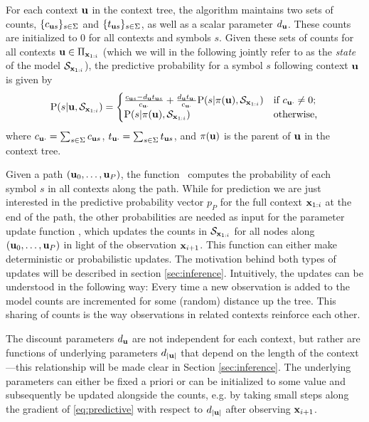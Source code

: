 For each context $\ubf$ in the context tree, the algorithm maintains two sets of counts, 
$\{c_{\ubf s}\}_{s \in \Sigma}$ and $\{t_{\ubf s}\}_{s \in \Sigma}$,
as well as a scalar parameter $d_{\ubf}$. These counts are initialized to
$0$ for all contexts and symbols $s$.
Given these sets of counts for all contexts $\ubf \in \Pi_{\xbf_{1:i}}$
(which we will in the following jointly refer to as the
\emph{state} of the model
$\statei$), the predictive probability for a symbol
$s$ following context $\ubf$ is given by
\begin{equation}
    \Prob(s|\ubf,\statei) = 
    \begin{cases}
    \frac{\cus - d_{\ubf} \tus}{\cu} + \frac{d_{\ubf}\tu
    }{\cu}\Prob(s|\parent(\ubf),\statei) & \text{if $\cu\neq 0$;} \\
    \Prob(s|\parent(\ubf),\statei) & \text{otherwise,}
    \end{cases}
    \label{eq:predictive}
\end{equation}
where $\cu = \sum_{s\in \Sigma} \cus$, $\tu =\sum_{s\in \Sigma} \tus$, and $\parent(\ubf)$ is the parent of $\ubf$ in the context tree.

Given a path $\Path$, the function 
\PathProbability\ computes the probability of each 
symbol $s$ in all contexts along the path. While for prediction we are just
interested in the predictive probability vector $p_P$ for the full context
$\xbf_{1:i}$ at the end of the path, the other probabilities are needed as input for the parameter update function \UpdatePath, which updates the counts in $\statei$ 
for all nodes along $\Path$ in light of the observation $\xbf_{i+1}$. 
This function can either make deterministic or probabilistic updates. The
motivation behind both types of updates will be described in section
\ref{sec:inference}. 
%
Intuitively, the updates can be understood in the following way: Every time a
new observation is added to the model counts are incremented for some (random)
distance up the tree.  This sharing of counts is the way observations in
related contexts reinforce each other.  

The discount parameters $d_{\ubf}$ are not independent for each context, but
rather are functions of underlying parameters $d_{|\ubf|}$ that depend on the
length of the context---this relationship will be made clear in Section
\ref{sec:inference}. The underlying parameters can either be fixed a
priori or can be initialized to some value and subsequently be updated
alongside the counts, e.g. by taking small steps along the gradient 
of \eqref{eq:predictive} with respect to $d_{|\ubf|}$ after observing $\xbf_{i+1}$.  

